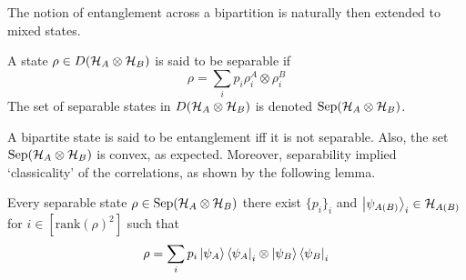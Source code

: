 The notion of entanglement across a bipartition is naturally then extended to mixed states.
\begin{definition}
    A state $\rho \in D(\mathcal{H}_A \otimes \mathcal{H}_B)$ is said to be separable if 
    \begin{equation}
        \rho = \sum_{i}p_i \rho^A_i \otimes \rho^B_i
    \end{equation}
    The set of separable states in $D(\mathcal{H}_A \otimes \mathcal{H}_B)$ is denoted $\text{Sep}(\mathcal{H}_A \otimes \mathcal{H}_B)$.
\end{definition}
A bipartite state is said to be entanglement iff it is not separable. Also, the set $\text{Sep}(\mathcal{H}_A\otimes\mathcal{H}_B)$ is convex, as expected. Moreover, separability implied `classicality' of the correlations, as shown by the following lemma.
\begin{lemma}
    Every separable state $\rho \in \text{Sep}(\mathcal{H}_A \otimes \mathcal{H}_B)$ there exist $\{p_i\}_i$ and $\ket{\psi_{A(B)}}_i \in \mathcal{H}_{A(B)}$ for $i \in [\text{rank}(\rho)^2]$ such that
    \begin{eqnarray}
        \rho = \sum_{i}p_i \ket{\psi_{A}} \bra{\psi_{A}}_i \otimes \ket{\psi_{B}}\bra{\psi_{B}}_i 
    \end{eqnarray}
\end{lemma}
